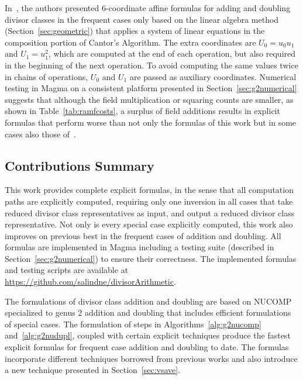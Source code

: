 In~\cite{CostelloLauter_geo_2011}, the authors presented $6$-coordinate affine
formulas for adding and doubling divisor classes in the frequent cases only
based on the linear algebra method (Section~\ref{sec:geometric}) that applies a
system of linear equations in the composition portion of Cantor's Algorithm. The
extra coordinates are $U_0 = u_0u_1$ and $U_1=u_1^2$, which are computed at the
end of each operation, but also required in the beginning of the next operation.
To avoid computing the same values twice in chains of operations, $U_0$ and
$U_1$ are passed as auxiliary coordinates. Numerical testing in Magma on a
consistent platform presented in Section~\ref{sec:g2numerical} suggests that
although the field multiplication or squaring counts are smaller, as shown in
Table~\ref{tab:ramfcosts}, a surplus of field additions results in explicit
formulas that perform worse than not only the formulas of this work but in some
cases also those of~\cite{Lange_explicit_2005}.

\subsection{Contributions Summary}
\label{sec:g2explRAMOurContr}
This work provides complete explicit formulas, in the sense that all computation
paths are explicitly computed, requiring only one inversion in all cases that
take reduced divisor class representatives as input, and output a reduced
divisor class representative. Not only is every special case explicitly
computed, this work also improves on previous best in the frequent cases of
addition and doubling. 
All formulas are implemented in Magma including a
testing suite (described in Section~\ref{sec:g2numerical}) to ensure their
correctness. The implemented formulas and testing scripts are available at
\url{https://github.com/salindne/divisorArithmetic}.

The formulations of divisor class addition and doubling are based on NUCOMP
specialized to genus 2 addition and doubling that includes efficient
formulations of special cases. The formulation of steps in
Algorithms~\ref{alg:g2nucomp} and~\ref{alg:g2nudupl}, coupled with certain
explicit techniques produce the fastest explicit formulas for frequent case
addition and doubling to date. The formulas incorporate different techniques
borrowed from previous works and also introduce a new technique presented in
Section~\ref{sec:vsave}. 

